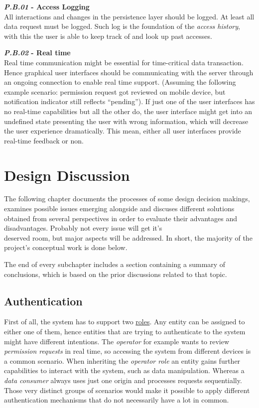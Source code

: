 \documentclass[12pt,english,a4paper,titlepage,cleardoublepage=empty,dottedtoc]{report}
\begin{document}
\textbf{\emph{\protect\hypertarget{pb01}{}{P.B.01}} - Access Logging}\\
All interactions and changes in the persistence layer should be logged.
At least all data request must be logged. Such log is the foundation of
the \emph{access history}, with this the user is able to keep track of
and look up past accesses.

\textbf{\emph{\protect\hypertarget{pb02}{}{P.B.02}} - Real time}\\
Real time communication might be essential for time-critical data
transaction. Hence graphical user interfaces should be communicating
with the server through an ongoing connection to enable real time
support. (Assuming the following example scenario: permission request
got reviewed on mobile device, but notification indicator still reflects
``pending''). If just one of the user interfaces has no real-time
capabilities but all the other do, the user interface might get into an
undefined state presenting the user with wrong information, which will
decrease the user experience dramatically. This mean, either all user
interfaces provide real-time feedback or non.

\hypertarget{design-discussion}{\chapter{Design
Discussion}\label{design-discussion}}

The following chapter documents the processes of some design decision
makings, examines possible issues emerging alongside and discuses
different solutions obtained from several perspectives in order to
evaluate their advantages and disadvantages. Probably not every issue
will get it's\\
deserved room, but major aspects will be addressed. In short, the
majority of the project's conceptual work is done below.

The end of every subchapter includes a section containing a summary of
conclusions, which is based on the prior discussions related to that
topic.

\hypertarget{authentication}{\section{Authentication}\label{authentication}}

First of all, the system has to support two
\protect\hyperlink{sa03}{roles}. Any entity can be assigned to either
one of them, hence entities that are trying to authenticate to the
system might have different intentions. The \emph{operator} for example
wants to review \emph{permission requests} in real time, so accessing
the system from different devices is a common scenario. When inheriting
the \emph{operator role} an entity gains further capabilities to
interact with the system, such as data manipulation. Whereas a
\emph{data consumer} always uses just one origin and processes requests
sequentially. Those very distinct groups of scenarios would make it
possible to apply different authentication mechanisms that do not
necessarily have a lot in common.
\end{document}
